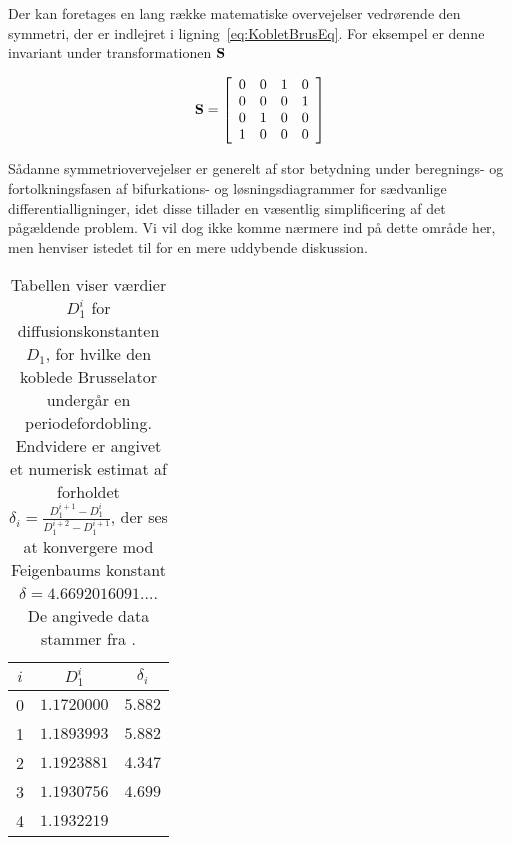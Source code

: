 Der kan foretages en lang r{\ae}kke matematiske
overvejelser vedr{\o}rende den symmetri, der er indlejret i
lig\-ning~\ref{eq:KobletBrusEq}. For eksempel er denne
invariant under transformationen ${\bf S}$

\begin{equation}
 {\bf S} =
 \left[
 \begin{array}{llll}
  0 & 0 & 1 & 0\\
  0 & 0 & 0 & 1\\
  0 & 1 & 0 & 0\\
  1 & 0 & 0 & 0
 \end{array}
 \right]
\end{equation}

S{\aa}danne symmetriovervejelser er generelt af stor
betydning under beregnings- og fortolkningsfasen af
bifurkations- og l{\o}sningsdiagrammer for s{\ae}dvanlige
differentiallig\-ninger, idet disse tillader en v{\ae}sentlig
simplificering af det p{\aa}\-g{\ae}ld\-ende problem. Vi
vil dog ikke komme n{\ae}rmere ind p{\aa} dette omr{\aa}de
her, men henviser istedet til \cite{Marek2} for en mere
uddybende diskussion.

\begin{table}[tbp]
 \renewcommand{\capfont}{\bf}
 \begin{minipage}{5cm}
 \begin{center}
  \begin{tabular}{|c|c|c|}                  \hline\hline
   $i$ & $D_1^i$       & $\delta_i$ \\ \hline
   0   & $1.172 000 0$ & $5.882$    \\ \hline
   1   & $1.189 399 3$ & $5.882$    \\ \hline
   2   & $1.192 388 1$ & $4.347$    \\ \hline
   3   & $1.193 075 6$ & $4.699$    \\ \hline
   4   & $1.193 221 9$ &            \\ \hline\hline
  \end{tabular}
 \end{center} 
 \end{minipage}
 \ \hfill \
 \begin{minipage}{8cm}
 \caption{\protect\capsize
   Tabellen viser v{\ae}rdier $D_1^i$ for
   diffusions\-konstanten $D_1$, for hvilke den koblede
   Brusselator underg{\aa}r en periodefordobling. Endvidere
   er angivet et numerisk estimat af forholdet $\delta_i =
   \frac{D_1^{i+1}-D_1^{i}}{D_1^{i+2}-D_1^{i+1}}$, der ses
   at konvergere mod Feigenbaums konstant
   $\delta=4.6692016091\ldots$. De angivede data stammer
   fra \protect\cite{Marek2}. }
 \label{tab:PerdobData}
\end{minipage}
\end{table} 
\renewcommand{\capfont}{\rm}

